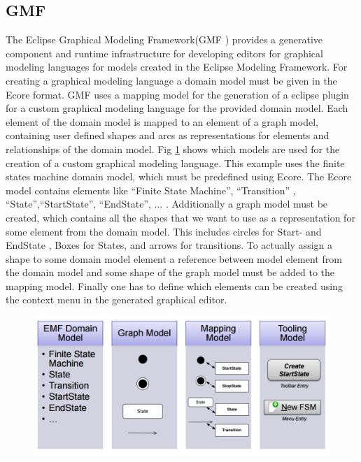\documentclass[runningheads,a4paper]{llncs}
\begin{document}
%    
    
    \subsection{GMF}
    The Eclipse Graphical Modeling Framework(GMF \cite{gmf}) provides a generative component and runtime infrastructure for developing 
    editors for graphical modeling languages for models created in the Eclipse Modeling Framework.
    For creating a graphical modeling language a domain model must be given in the Ecore format.
    GMF uses a mapping model for the generation of a eclipse plugin for a custom graphical modeling language for the provided domain model. 
    Each element of the domain model is mapped to an element of a graph model, containing user defined shapes and arcs as representations for elements 
    and relationships of the domain model. Fig \ref{mapmodel} shows which models are used for the creation of a custom graphical modeling language.
    This example uses the finite states machine domain model, which must be predefined using Ecore. 
    The Ecore model contains elements like ``Finite State Machine'', ``Transition'' , ``State'',``StartState'', ``EndState'', ... .
    Additionally a graph model must be created, which contains all the shapes that we want to 
    use as a representation for some element from the domain model. This includes circles for Start- and EndState , Boxes for States,
    and arrows for transitions. To actually assign a shape to some domain model element a reference between model element from the domain model 
    and some shape of the graph model must be added to the mapping model. Finally one has to define which elements can be created using the context 
    menu in the generated graphical editor.

    \begin{figure}[ht]
      \centering
      \includegraphics[width=\textwidth]{images/TableGMFSteps.PNG}
      \label{mapmodel}
    \end{figure}
    
\end{document}
